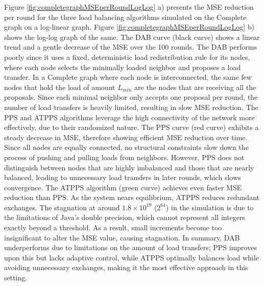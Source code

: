 Figure \ref{fig:completegraphMSEperRoundLogLog} a) presents the MSE reduction per round for the three load balancing algorithms simulated on the Complete graph on a log-linear graph. Figure \ref{fig:completegraphMSEperRoundLogLog} b) shows the log-log graph of the same. The DAB curve (black curve) shows a linear trend and a gentle decrease of the MSE over the 100 rounds. The DAB performs poorly since it uses a fixed, deterministic load redistribution rule for its nodes, where each node selects the minimally loaded neighbor and proposes a load transfer. In a Complete graph where each node is interconnected, the same few nodes that hold the load of amount $L_{min}$ are the nodes that are receiving all the proposals. Since each minimal neighbor only accepts one proposal per round, the number of load transfers is heavily limited, resulting in slow MSE reduction. The PPS and ATPPS algorithms leverage the high connectivity of the network more effectively, due to their randomized nature. The PPS curve (red curve) exhibits a steady decrease in MSE, therefore showing efficient MSE reduction over time. Since all nodes are equally connected, no structural constraints slow down the process of pushing and pulling loads from neighbors. However, PPS does not distinguish between nodes that are highly imbalanced and those that are nearly balanced, leading to unnecessary load transfers in later rounds, which slows convergence. The ATPPS algorithm (green curve) achieves even faster MSE reduction than PPS. As the system nears equilibrium, ATPPS reduces redundant exchanges. The stagnation at around $1.8\times 10^{19}$ ($2^{64}$) in the simulation is due to the limitations of Java's double precision, which cannot represent all integers exactly beyond a threshold. As a result, small increments become too insignificant to alter the MSE value, causing stagnation. In summary, DAB underperforms due to limitations on the amount of load transfers; PPS improves upon this but lacks adaptive control, while ATPPS optimally balances load while avoiding unnecessary exchanges, making it the most effective approach in this setting.

